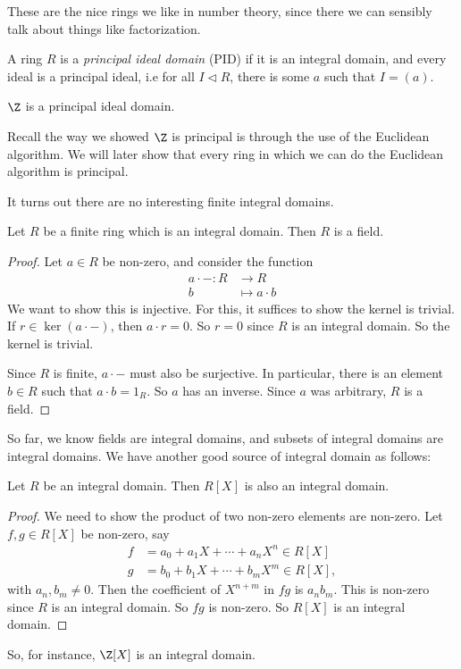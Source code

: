 \documentclass[a4paper]{article}
\begin{document}
These are the nice rings we like in number theory, since there we can sensibly talk about things like factorization.

\begin{defi}
  A ring $R$ is a \emph{principal ideal domain} (PID) if it is an integral domain, and every ideal is a principal ideal, i.e for all $I \lhd R$, there is some $a$ such that $I = (a)$.
\end{defi}

\begin{eg}
  $\Z$ is a principal ideal domain.
\end{eg}
Recall the way we showed $\Z$ is principal is through the use of the Euclidean algorithm. We will later show that every ring in which we can do the Euclidean algorithm is principal.

It turns out there are no interesting finite integral domains.
\begin{lemma}
  Let $R$ be a finite ring which is an integral domain. Then $R$ is a field.
\end{lemma}

\begin{proof}
  Let $a \in R$ be non-zero, and consider the function
  \begin{align*}
    a \cdot -: R &\to R\\
    b &\mapsto a \cdot b
  \end{align*}
  We want to show this is injective. For this, it suffices to show the kernel is trivial. If $r \in \ker (a \cdot -)$, then $a \cdot r = 0$. So $r = 0$ since $R$ is an integral domain. So the kernel is trivial.

  Since $R$ is finite, $a\cdot -$ must also be surjective. In particular, there is an element $b \in R$ such that $a \cdot b = 1_R$. So $a$ has an inverse. Since $a$ was arbitrary, $R$ is a field.
\end{proof}

So far, we know fields are integral domains, and subsets of integral domains are integral domains. We have another good source of integral domain as follows:
\begin{lemma}
  Let $R$ be an integral domain. Then $R[X]$ is also an integral domain.
\end{lemma}

\begin{proof}
  We need to show the product of two non-zero elements are non-zero. Let $f, g\in R[X]$ be non-zero, say
  \begin{align*}
    f &= a_0 + a_1X + \cdots + a_n X^n \in R[X]\\
    g &= b_0 + b_1X + \cdots + b_m X^m \in R[X],
  \end{align*}
  with $a_n, b_m \not= 0$. Then the coefficient of $X^{n + m}$ in $fg$ is $a_n b_m$. This is non-zero since $R$ is an integral domain. So $fg$ is non-zero. So $R[X]$ is an integral domain.
\end{proof}
So, for instance, $\Z[X]$ is an integral domain.
\end{document}
